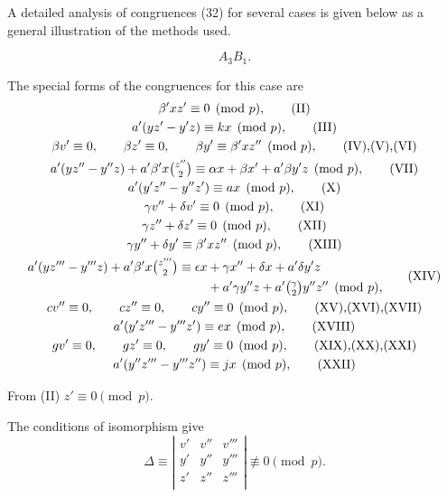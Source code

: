 \documentclass[oneside]{article}
\begin{document}
A detailed analysis of congruences (32) for several cases is given below
as a general illustration of the methods used.

\medskip
\begin{equation*} A_3 B_1. \end{equation*}

The special forms of the congruences for this case are
\begin{gather*}
\beta'xz' \equiv 0 \pmod{p}, \tag{II} \\
a'(yz' - y'z) \equiv kx \pmod{p}, \tag{III} \\
\beta v' \equiv 0, \qquad \beta z' \equiv 0, \qquad \beta y' \equiv
   \beta'xz'' \pmod{p}, \tag*{(IV),(V),(VI)} \\
a'(yz'' - y''z) + a'\beta'x\tbinom{z''}{2} \equiv
\alpha x + \beta x' + a'\beta y'z \pmod{p}, \tag{VII} \\
a'(y'z'' - y''z') \equiv ax \pmod{p}, \tag{X} \\
\gamma v'' + \delta v' \equiv 0 \pmod{p}, \tag{XI} \\
\gamma z'' + \delta z' \equiv 0 \pmod{p}, \tag{XII} \\
\gamma y'' + \delta y' \equiv \beta'xz'' \pmod{p}, \tag{XIII} \\
\begin{split}
  a'(yz''' - y'''z) + a'\beta'x\tbinom{z'''}{2} \equiv \epsilon x &+
  \gamma x'' + \delta x + a'\delta y'z \\ &+ a'\gamma y''z
  + a'\tbinom{\gamma}{2}y''z'' \pmod{p},
\end{split} \tag{XIV} \\
cv'' \equiv 0, \qquad cz'' \equiv 0, \qquad cy'' \equiv 0 \pmod{p},
  \tag*{(XV),(XVI),(XVII)} \\
a'(y'z''' - y'''z') \equiv ex \pmod{p}, \tag{XVIII} \\
gv' \equiv 0, \qquad gz' \equiv 0, \qquad gy' \equiv 0 \pmod{p},
  \tag*{(XIX),(XX),(XXI)} \\
a'(y''z''' - y'''z'') \equiv jx \pmod{p}, \tag{XXII}
\end{gather*}

From (II) $z' \equiv 0 \pmod{p}$.

The conditions of isomorphism give
\begin{equation*}
  \Delta \equiv \left| \begin{matrix}
                          v' & v'' & v''' \\
                          y' & y'' & y''' \\
                          z' & z'' & z''' \\ \end{matrix}\right| \not\equiv 0 \pmod{p}.
\end{equation*}
\end{document}
